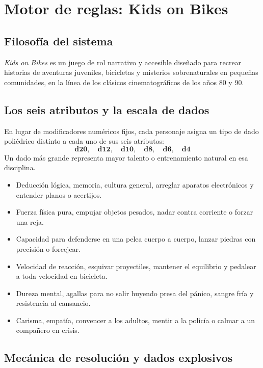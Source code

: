 \chapter{Motor de reglas: Kids on Bikes}

\section{Filosofía del sistema}

\emph{Kids on Bikes} es un juego de rol narrativo y accesible diseñado para recrear historias de aventuras juveniles, bicicletas y misterios sobrenaturales en pequeñas comunidades, en la línea de los clásicos cinematográficos de los años 80 y 90.

\section{Los seis atributos y la escala de dados}

En lugar de modificadores numéricos fijos, cada personaje asigna un tipo de dado poliédrico distinto a cada uno de sus seis atributos:
\[
\mathbf{d20,\quad d12,\quad d10,\quad d8,\quad d6,\quad d4}
\]
Un dado más grande representa mayor talento o entrenamiento natural en esa disciplina.

\begin{itemize}
  \item {} Deducción lógica, memoria, cultura general, arreglar aparatos electrónicos y entender planos o acertijos.
  \item {} Fuerza física pura, empujar objetos pesados, nadar contra corriente o forzar una reja.
  \item {} Capacidad para defenderse en una pelea cuerpo a cuerpo, lanzar piedras con precisión o forcejear.
  \item {} Velocidad de reacción, esquivar proyectiles, mantener el equilibrio y pedalear a toda velocidad en bicicleta.
  \item {} Dureza mental, agallas para no salir huyendo presa del pánico, sangre fría y resistencia al cansancio.
  \item {} Carisma, empatía, convencer a los adultos, mentir a la policía o calmar a un compañero en crisis.
\end{itemize}

\section{Mecánica de resolución y dados explosivos}

